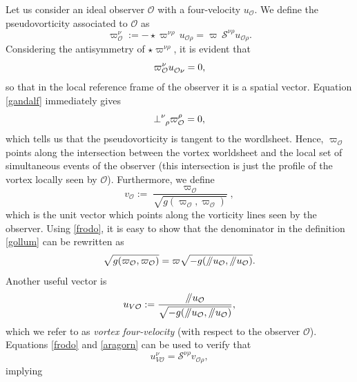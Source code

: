\documentclass[usenatbib%
]{mnras}
\newcommand{\paral}{\mathbin{ \, \!/\mkern-5mu/\!} \,}
\begin{document}
Let us consider an ideal observer $\mathcal{O}$ with a four-velocity $u_{\mathcal{O}}$. 
We define the pseudovorticity associated to $\mathcal{O}$ as
\begin{equation}\label{gigi}
\varpi_{\mathcal{O}}^\nu := - {\star}\varpi^{\nu \rho} \, u_{\mathcal{O} \rho} = \varpi \, \mathcal{S}^{\nu \rho} u_{\mathcal{O} \rho}.
\end{equation} 
Considering the antisymmetry of ${\star}\varpi^{\nu \rho}$, it is evident that
\begin{equation}\label{gimli}
\varpi_{\mathcal{O}}^\nu u\indices{_{\mathcal{O}\nu}} =0,
\end{equation}
so that in the local reference frame of the observer it is a spatial vector. 
Equation \eqref{gandalf} immediately gives
\begin{equation}
{\perp}\indices{^\nu _\rho} \varpi_{\mathcal{O}}^\rho= 0, 
\end{equation}
which tells us that the pseudovorticity is tangent to the wordlsheet. 
Hence, $\varpi_{\mathcal{O}}$ points along the intersection between the vortex worldsheet and the local set of simultaneous events of the observer (this intersection is just the profile of the vortex locally seen by $\mathcal{O}$). 
Furthermore, we define
\begin{equation}\label{gollum}
v_{\mathcal{O}} := \dfrac{\varpi_{\mathcal{O}} }{\sqrt{g(\varpi_{\mathcal{O}},\varpi_{\mathcal{O}})}}, 
\end{equation}
which is the unit vector which points along the vorticity lines seen by the observer. Using \eqref{frodo}, it is easy to show that the denominator in the definition \eqref{gollum} can be rewritten as
\begin{equation}\label{aragorn}
\sqrt{g(\varpi_{\mathcal{O}},\varpi_{\mathcal{O}})} = \varpi \sqrt{-g(\paral u_{\mathcal{O}},\paral u_{\mathcal{O}})}.
\end{equation}
Another useful vector is
\begin{equation}\label{pralna}
u_{{V\mathcal{O}}} := \dfrac{\paral u_{\mathcal{O}}}{\sqrt{-g(\paral u_{\mathcal{O}},\paral u_{\mathcal{O}})}},
\end{equation}
which we refer to as \emph{vortex four-velocity} (with respect to the observer $\mathcal{O}$). 
Equations \eqref{frodo} and \eqref{aragorn} can be used to verify that 
\begin{equation}\label{tosto}
u_{V{\mathcal{O}}}^\nu = \mathcal{S}^{\nu \rho} v_{{\mathcal{O}}\rho},
\end{equation}
implying
\end{document}
